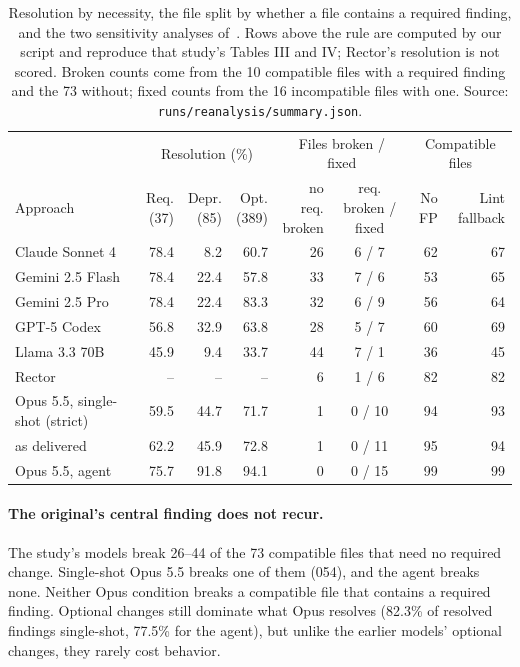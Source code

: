 \documentclass[11pt]{article}
\newcommand{\code}[1]{\texttt{#1}}
\begin{document}
\begin{table}[t]
\centering\small
\caption{Resolution by necessity, the file split by whether a file contains a required finding, and the two sensitivity analyses of~\cite{mahmud2026modernization}. Rows above the rule are computed by our script and reproduce that study's Tables III and IV; Rector's resolution is not scored. Broken counts come from the 10 compatible files with a required finding and the 73 without; fixed counts from the 16 incompatible files with one. Source: \code{runs/reanalysis/summary.json}.}
\label{tab:necessity}
\setlength{\tabcolsep}{3.5pt}\begin{tabular}{lrrrrcrr}
\toprule
& \multicolumn{3}{c}{Resolution (\%)} & \multicolumn{2}{c}{Files broken / fixed} & \multicolumn{2}{c}{Compatible files} \\
\cmidrule(lr){2-4}\cmidrule(lr){5-6}\cmidrule(lr){7-8}
Approach & \shortstack{Req.\\(37)} & \shortstack{Depr.\\(85)} & \shortstack{Opt.\\(389)} & \shortstack{no req.\\broken} & \shortstack{req.\\broken / fixed} & \shortstack{No\\FP} & \shortstack{Lint\\fallback} \\
\midrule
Claude Sonnet 4 & 78.4 & 8.2 & 60.7 & 26 & 6 / 7 & 62 & 67 \\
Gemini 2.5 Flash & 78.4 & 22.4 & 57.8 & 33 & 7 / 6 & 53 & 65 \\
Gemini 2.5 Pro & 78.4 & 22.4 & 83.3 & 32 & 6 / 9 & 56 & 64 \\
GPT-5 Codex & 56.8 & 32.9 & 63.8 & 28 & 5 / 7 & 60 & 69 \\
Llama 3.3 70B & 45.9 & 9.4 & 33.7 & 44 & 7 / 1 & 36 & 45 \\
Rector & -- & -- & -- & 6 & 1 / 6 & 82 & 82 \\
\midrule
Opus 5.5, single-shot (strict) & 59.5 & 44.7 & 71.7 & 1 & 0 / 10 & 94 & 93 \\
\quad as delivered & 62.2 & 45.9 & 72.8 & 1 & 0 / 11 & 95 & 94 \\
Opus 5.5, agent & 75.7 & 91.8 & 94.1 & 0 & 0 / 15 & 99 & 99 \\
\bottomrule
\end{tabular}
\end{table}

\paragraph{The original's central finding does not recur.}
The study's models break 26--44 of the 73 compatible files that need no required change.
Single-shot Opus 5.5 breaks one of them (054), and the agent breaks none.
Neither Opus condition breaks a compatible file that contains a required finding.
Optional changes still dominate what Opus resolves (82.3\% of resolved findings single-shot, 77.5\% for the agent), but unlike the earlier models' optional changes, they rarely cost behavior.
\end{document}
